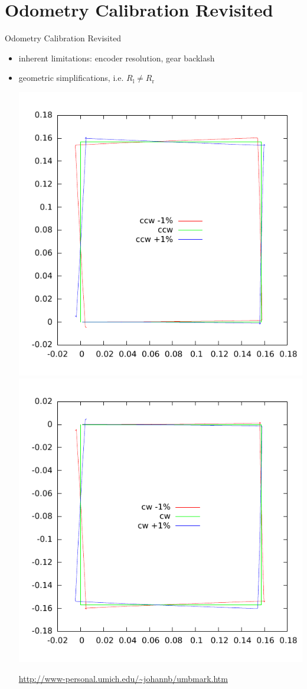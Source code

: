 \documentclass{beamer}
\begin{document}
\section{Odometry Calibration Revisited}
\begin{frame}{Odometry Calibration Revisited}
  
  \begin{itemize}
  \item
    inherent limitations: encoder resolution, gear backlash
  \item
    geometric simplifications, i.e. $R_\text{l} \ne R_\text{r}$
    
    \includegraphics[width=0.4\columnwidth]{odom-ccw.pdf}%
    \includegraphics[width=0.4\columnwidth]{odom-cw.pdf}
    
    \url{http://www-personal.umich.edu/~johannb/umbmark.htm}
  \end{itemize}
  
\end{frame}  
\end{document}
